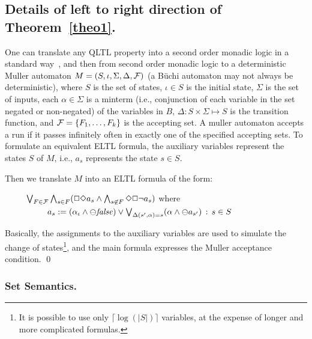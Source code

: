 \documentclass{llncs}
\begin{document}
\subsection*{Details of left to right direction of Theorem~\ref{theo1}.}
One can translate any QLTL property into a second order monadic logic in a standard
way~\cite{Thomas}, and then from
second order monadic logic to a deterministic Muller automaton $M = (S, \iota , \Sigma, \Delta, {\cal F})$ (a B\"{u}chi automaton may not always be deterministic), where $S$ is the set of states, $\iota \in S$ is the initial state, $\Sigma$ is the set of inputs, each $\alpha \in \Sigma$ is a minterm (i.e., conjunction of
each variable in the set negated or non-negated) of the variables in $B$, $\Delta : S \times \Sigma \mapsto S$ is the transition function, and ${\cal F} = \{ F_1 , \ldots , F_k \}$ is the accepting set. A muller automaton 
accepts a run if it 
passes infinitely often in exactly
one of the specified accepting sets. To formulate an equivalent ELTL formula,
the auxiliary variables represent the states $S$ of $M$, i.e., $a_s$ represents the state $s \in S$.


\noindent
Then we translate $M$ into an ELTL formula
of the form: 

\begin{tabbing}
\ \ \ \ \ $\bigvee_{F \in {\cal F}} \bigwedge_{s \in F} ( \Box\Diamond a_s \wedge \bigwedge_{s \not\in F} \Diamond \Box \neg a_s)$
where \\
\ \ \ \ \ \ \ \ \ \ $a_s :=   ( \alpha_{\iota} \wedge \ominus \mathit{false} ) \vee \bigvee_{\Delta ( s'
, \alpha ) = s } 
(\alpha \wedge \ominus a_{s'}) 
\, :\,  s \in S$
\end{tabbing}

\noindent
Basically, the assignments to the auxiliary variables are used to simulate the change of states\footnote{It is possible to use only $\lceil \log ( | S | ) \rceil$
variables, at the expense of longer and more complicated formulas.}, and the main formula expresses the Muller acceptance condition. \qed


\subsubsection*{Set Semantics.}
\end{document}
